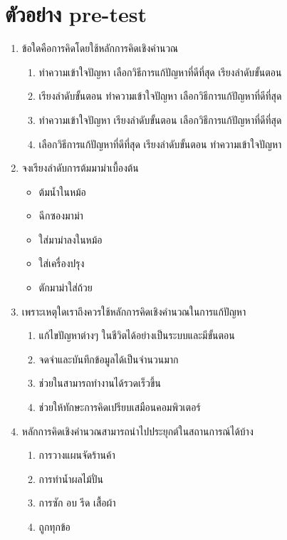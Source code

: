 \section{ตัวอย่าง pre-test}
\begin{enumerate}
    \item ข้อใดคือการคิดโดยใช้หลักการคิดเชิงคำนวณ
    \begin{enumerate}
        \item ทำความเข้าใจปัญหา เลือกวิธีการแก้ปัญหาที่ดีที่สุด เรียงลำดับขั้นตอน
        \item เรียงลำดับขั้นตอน ทำความเข้าใจปัญหา เลือกวิธีการแก้ปัญหาที่ดีที่สุด
        \item ทำความเข้าใจปัญหา เรียงลำดับขั้นตอน เลือกวิธีการแก้ปัญหาที่ดีที่สุด
        \item เลือกวิธีการแก้ปัญหาที่ดีที่สุด เรียงลำดับขั้นตอน ทำความเข้าใจปัญหา
    \end{enumerate}
    \item จงเรียงลำดับการต้มมาม่าเบื้องต้น
    \begin{itemize}
        \item ต้มน้ำในหม้อ
        \item ฉีกซองมาม่า
        \item ใส่มาม่าลงในหม้อ
        \item ใส่เครื่องปรุง
        \item ตักมาม่าใส่ถ้วย
    \end{itemize}
    \item เพราะเหตุใดเราถึงควรใช้หลักการคิดเชิงคำนวณในการแก้ปัญหา
    \begin{enumerate}
        \item แก้ไขปัญหาต่างๆ ในชีวิตได้อย่างเป็นระบบและมีขั้นตอน
        \item จดจำและบันทึกข้อมูลได้เป็นจำนวนมาก
        \item ช่วยในสามารถทำงานได้รวดเร็วขึ้น
        \item ช่วยให้ทักษะการคิดเปรียบเสมือนคอมพิวเตอร์
    \end{enumerate}
    \item หลักการคิดเชิงคำนวณสามารถนำไปประยุกต์ในสถานการณ์ได้บ้าง
    \begin{enumerate}
        \item การวางแผนจัดร้านค้า
        \item การทำน้ำผลไม้ปั่น
        \item การซัก อบ รีด เสื้อผ้า
        \item ถูกทุกข้อ
    \end{enumerate}

\end{enumerate}
